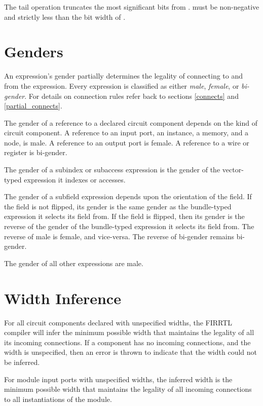 \documentclass[12pt]{article}
\begin{document}
The tail operation truncates the  most significant bits from .  must be non-negative and strictly less than the bit width of .

\section{Genders}\label{genders}

An expression's gender partially determines the legality of connecting to and from the expression. Every expression is classified as either {\em male}, {\em female}, or {\em bi-gender}. For details on connection rules refer back to sections \ref{connects} and \ref{partial_connects}.

The gender of a reference to a declared circuit component depends on the kind of circuit component. A reference to an input port, an instance, a memory, and a node, is male. A reference to an output port is female. A reference to a wire or register is bi-gender.

The gender of a subindex or subaccess expression is the gender of the vector-typed expression it indexes or accesses.

The gender of a subfield expression depends upon the orientation of the field. If the field is not flipped, its gender is the same gender as the bundle-typed expression it selects its field from. If the field is flipped, then its gender is the reverse of the gender of the bundle-typed expression it selects its field from. The reverse of male is female, and vice-versa. The reverse of bi-gender remains bi-gender.

The gender of all other expressions are male.

\section{Width Inference}\label{width_inference}

For all circuit components declared with unspecified widths, the FIRRTL compiler will infer the minimum possible width that maintains the legality of all its incoming connections. If a component has no incoming connections, and the width is unspecified, then an error is thrown to indicate that the width could not be inferred. 

For module input ports with unspecified widths, the inferred width is the minimum possible width that maintains the legality of all incoming connections to all instantiations of the module.
\end{document}
